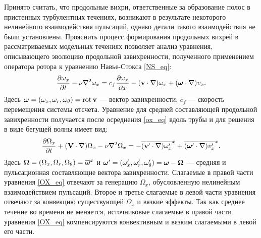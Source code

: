 Принято считать, что продольные вихри, ответственные за образование полос в пристенных турбулентных течениях, возникают в результате некоторого нелинейного взаимодействия пульсаций, однако детали такого взаимодействия не были установлены. Прояснить процесс формирования продольных вихрей в рассматриваемых модельных течениях позволяет анализ уравнения, описывающего эволюцию продольной завихренности, полученного применением оператора ротора к уравнению Навье-Стокса \eqref{NS_eq}:
\begin{equation}\label{ox_eq}
\frac{\partial \omega_x}{\partial t} - \nu\nabla^2 \omega_x =  c_f \frac{\partial \omega_x}{\partial x} -  (\mathbf{v} \cdot \nabla) \omega_x + (\mbox{\boldmath$\omega$} \cdot \nabla) v_x.
\end{equation}
Здесь $\mbox{\boldmath$\omega$} = (\omega_x, \omega_r, \omega_\theta) = \mathop{}\!\operatorname{rot} \mathbf{v}$ --- вектор завихренности, $c_f$ --- скорость перемещения системы отсчета. Уравнение для средней составляющей продольной завихренности получается после осреднения \eqref{ox_eq} вдоль трубы и для решения в виде бегущей волны имеет вид:
\begin{equation}\label{OX_eq}
\frac{\partial \Omega_x}{\partial t} + (\mathbf{V} \cdot \nabla) \Omega_x - \nu\nabla^2 \Omega_x = - \overline{(\mathbf{v}' \cdot \nabla) \omega'_x}^x + \overline{ (\mbox{\boldmath$\omega$}' \cdot \nabla) v'_x }^x.
\end{equation}
Здесь  $\mbox{\boldmath$\Omega$}=(\Omega_x, \Omega_r, \Omega_\theta) = \overline{\mbox{\boldmath$\omega$}}^x$ и $\mbox{\boldmath$\omega$}'=(\omega'_x, \omega'_r, \omega'_\theta) = \mbox{\boldmath$\omega$} - \mbox{\boldmath$\Omega$}$ --- средняя и пульсационная составляющие вектора завихренности. Слагаемые в правой части уравнения \eqref{OX_eq} отвечают за генерацию $\Omega_x$, обусловленную нелинейным взаимодействием пульсаций. Второе и третье слагаемые в левой части уравнения отвечают за конвекцию существующей $\Omega_x$ и вязкие эффекты. Так как среднее течение во времени не меняется, источниковые слагаемые в правой части уравнения \eqref{OX_eq} компенсируются конвективным и вязким слагаемыми в левой его части. 

